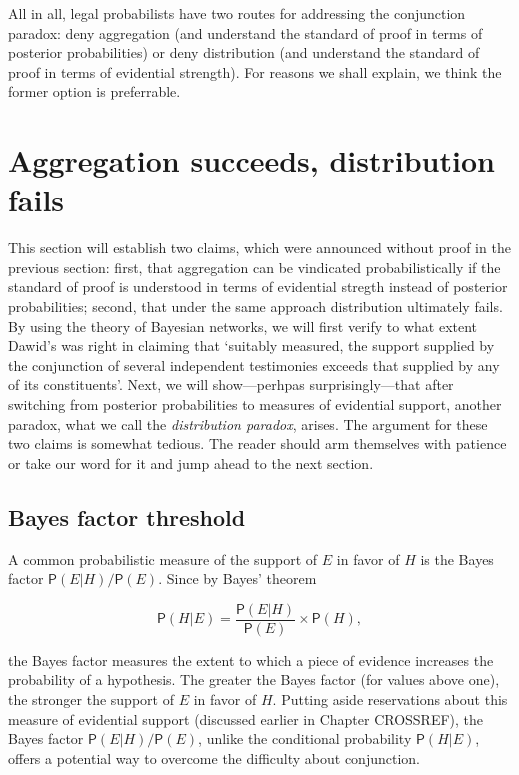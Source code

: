 \documentclass[10pt,dvipsnames,enabledeprecatedfontcommands]{scrartcl}
\newcommand{\pr}[1]{\mathsf{P}(#1)}
\begin{document}
All in all, legal probabilists have two routes for addressing the
conjunction paradox: deny aggregation (and understand the standard of
proof in terms of posterior probabilities) or deny distribution (and
understand the standard of proof in terms of evidential strength). For
reasons we shall explain, we think the former option is preferrable.

\section{Aggregation succeeds, distribution
fails}\label{aggregation-succeeds-distribution-fails}

This section will establish two claims, which were announced without
proof in the previous section: first, that aggregation can be vindicated
probabilistically if the standard of proof is understood in terms of
evidential stregth instead of posterior probabilities; second, that
under the same approach distribution ultimately fails. By using the
theory of Bayesian networks, we will first verify to what extent Dawid's
was right in claiming that `suitably measured, the support supplied by
the conjunction of several independent testimonies exceeds that supplied
by any of its constituents'. Next, we will show---perhpas
surprisingly---that after switching from posterior probabilities to
measures of evidential support, another paradox, what we call the
\textit{distribution paradox}, arises. The argument for these two claims
is somewhat tedious. The reader should arm themselves with patience or
take our word for it and jump ahead to the next section.

\subsection{Bayes factor threshold}\label{bayes-factor-threshold}

A common probabilistic measure of the support of \(E\) in favor of \(H\)
is the Bayes factor \(\pr{E \vert H}/\pr{E}\). Since by Bayes' theorem

\[\pr{H \vert E} = \frac{\pr{E \vert H}}{\pr{E}}\times \pr{H},\]

\noindent
the Bayes factor measures the extent to which a piece of evidence
increases the probability of a hypothesis. The greater the Bayes factor
(for values above one), the stronger the support of \(E\) in favor of
\(H\). Putting aside reservations about this measure of evidential
support (discussed earlier in Chapter CROSSREF), the Bayes factor
\(\pr{E | H}/\pr{E}\), unlike the conditional probability
\(\pr{H | E}\), offers a potential way to overcome the difficulty about
conjunction.
\end{document}
